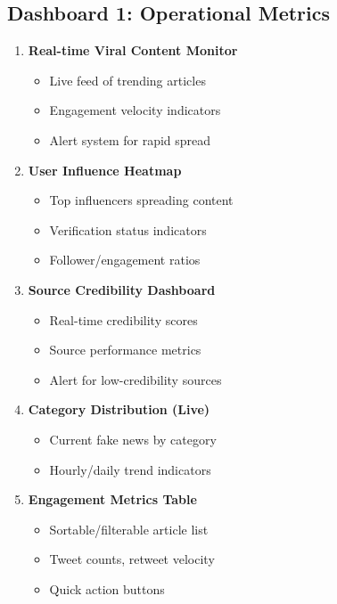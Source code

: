 \documentclass[12pt,a4paper]{article}
\begin{document}
\subsection{Dashboard 1: Operational Metrics}
\begin{enumerate}
    \item \textbf{Real-time Viral Content Monitor}
    \begin{itemize}
        \item Live feed of trending articles
        \item Engagement velocity indicators
        \item Alert system for rapid spread
    \end{itemize}
    
    \item \textbf{User Influence Heatmap}
    \begin{itemize}
        \item Top influencers spreading content
        \item Verification status indicators
        \item Follower/engagement ratios
    \end{itemize}
    
    \item \textbf{Source Credibility Dashboard}
    \begin{itemize}
        \item Real-time credibility scores
        \item Source performance metrics
        \item Alert for low-credibility sources
    \end{itemize}
    
    \item \textbf{Category Distribution (Live)}
    \begin{itemize}
        \item Current fake news by category
        \item Hourly/daily trend indicators
    \end{itemize}
    
    \item \textbf{Engagement Metrics Table}
    \begin{itemize}
        \item Sortable/filterable article list
        \item Tweet counts, retweet velocity
        \item Quick action buttons
    \end{itemize}
\end{enumerate}
\end{document}
